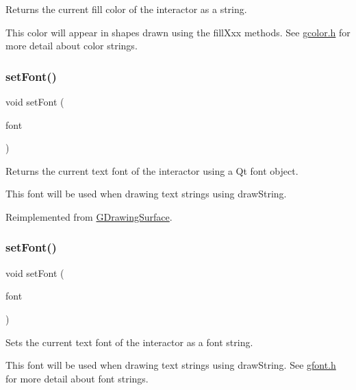 Returns the current fill color of the interactor as a string. 

This color will appear in shapes drawn using the fill\+Xxx methods. See \mbox{\hyperlink{gcolor_8h_source}{gcolor.\+h}} for more detail about color strings. \mbox{\label{classGCanvas_a2d22014c7fa3bccfd58c982aea1b55fa}} 
\subsubsection{\texorpdfstring{set\+Font()}{setFont()}\hspace{0.1cm}{\footnotesize\ttfamily [1/2]}}
{\footnotesize\ttfamily void set\+Font (\begin{DoxyParamCaption}\item[{const Q\+Font \&}]{font }\end{DoxyParamCaption})\hspace{0.3cm}{\ttfamily [virtual]}}



Returns the current text font of the interactor using a Qt font object. 

This font will be used when drawing text strings using draw\+String. 

Reimplemented from \mbox{\hyperlink{classGDrawingSurface}{G\+Drawing\+Surface}}.

\mbox{\label{classGCanvas_ab39ef411fb13a52852ddd138c5932e2e}} 
\subsubsection{\texorpdfstring{set\+Font()}{setFont()}\hspace{0.1cm}{\footnotesize\ttfamily [2/2]}}
{\footnotesize\ttfamily void set\+Font (\begin{DoxyParamCaption}\item[{const std\+::string \&}]{font }\end{DoxyParamCaption})\hspace{0.3cm}{\ttfamily [virtual]}}



Sets the current text font of the interactor as a font string. 

This font will be used when drawing text strings using draw\+String. See \mbox{\hyperlink{gfont_8h_source}{gfont.\+h}} for more detail about font strings. 

